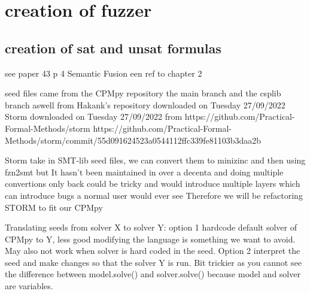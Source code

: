 \chapter{creation of fuzzer}
\label{cha:x}


\section{creation of sat and unsat formulas}
see paper 43 p 4
Semantic Fusion
\cite{43YinYang}
een ref to chapter 2

seed files came from the CPMpy repository the main branch and the csplib branch aswell from Hakank's repository downloaded on Tuesday 27/09/2022
Storm downloaded on Tuesday 27/09/2022 from https://github.com/Practical-Formal-Methods/storm 
https://github.com/Practical-Formal-Methods/storm/commit/55d091624523a0544112ffc339fe81103b3daa2b



Storm take in SMT-lib seed files, we can convert them to minizinc and then using fzn2smt but It hasn't been maintained in over a decenta and doing multiple convertions only back could be tricky and would introduce multiple layers which can introduce bugs a normal user would ever see
Therefore we will be refactoring STORM to fit our CPMpy


Translating seeds from solver X to solver Y: 
option 1 hardcode default solver of CPMpy to Y, less good modifying the language is something we want to avoid. May also not work when solver is hard coded in the seed.
Option 2 interpret the seed and make changes so that the solver Y is run. Bit trickier as you cannot see the difference between model.solve() and solver.solve() because model and solver are variables.






















